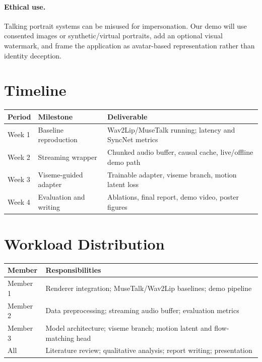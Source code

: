 \documentclass{article}
\begin{document}
\paragraph{Ethical use.}
Talking portrait systems can be misused for impersonation. Our demo will use consented images or synthetic/virtual portraits, add an optional visual watermark, and frame the application as avatar-based representation rather than identity deception.

\section{Timeline}

\begin{table}[h]
\centering
\small
\begin{tabular}{@{}lll@{}}
\toprule
\textbf{Period} & \textbf{Milestone} & \textbf{Deliverable} \\
\midrule
Week 1 & Baseline reproduction & Wav2Lip/MuseTalk running; latency and SyncNet metrics \\
Week 2 & Streaming wrapper & Chunked audio buffer, causal cache, live/offline demo path \\
Week 3 & Viseme-guided adapter & Trainable adapter, viseme branch, motion latent loss \\
Week 4 & Evaluation and writing & Ablations, final report, demo video, poster figures \\
\bottomrule
\end{tabular}
\end{table}

\section{Workload Distribution}

\begin{table}[h]
\centering
\small
\begin{tabular}{@{}ll@{}}
\toprule
\textbf{Member} & \textbf{Responsibilities} \\
\midrule
Member 1 & Renderer integration; MuseTalk/Wav2Lip baselines; demo pipeline \\
Member 2 & Data preprocessing; streaming audio buffer; evaluation metrics \\
Member 3 & Model architecture; viseme branch; motion latent and flow-matching head \\
\midrule
All & Literature review; qualitative analysis; report writing; presentation \\
\bottomrule
\end{tabular}
\end{table}



\end{document}

